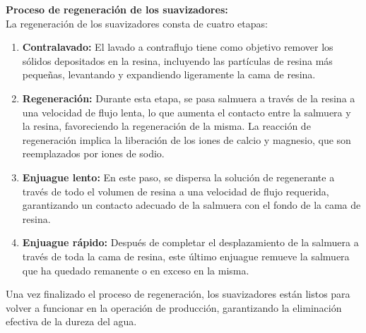 \textbf{Proceso de regeneración de los suavizadores:}\\
La regeneración de los suavizadores consta de cuatro etapas:
\begin{enumerate}

    \item \textbf{ Contralavado:} El lavado a contraflujo tiene como objetivo remover los sólidos depositados en la resina, incluyendo las partículas de resina más pequeñas, levantando y expandiendo ligeramente la cama de resina.

    \item \textbf{ Regeneración:} Durante esta etapa, se pasa salmuera a través de la resina a una velocidad de flujo lenta, lo que aumenta el contacto entre la salmuera y la resina, favoreciendo la regeneración de la misma. La reacción de regeneración implica la liberación de los iones de calcio y magnesio, que son reemplazados por iones de sodio.

    \item \textbf{ Enjuague lento:} En este paso, se dispersa la solución de regenerante a través de todo el volumen de resina a una velocidad de flujo requerida, garantizando un contacto adecuado de la salmuera con el fondo de la cama de resina.

    \item \textbf{ Enjuague rápido:} Después de completar el desplazamiento de la salmuera a través de toda la cama de resina, este último enjuague remueve la salmuera que ha quedado remanente o en exceso en la misma.

    
\end{enumerate}

Una vez finalizado el proceso de regeneración, los suavizadores están listos para volver a funcionar en la operación de producción, garantizando la eliminación efectiva de la dureza del agua.






